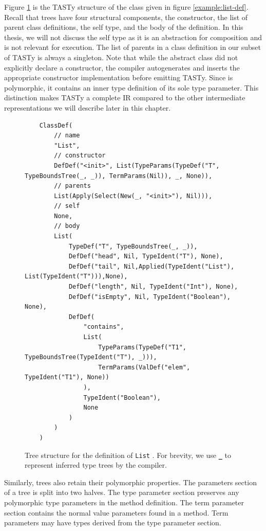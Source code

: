 Figure \ref{tasty:list} is the TASTy structure of the  class given in figure \ref{example:list-def}. 
Recall that  trees have four structural components, the constructor, the list of parent class definitions, the self type, and the body of the definition.
In this thesis, we will not discuss the self type as it is an abstraction for composition\cite{gilad:mixins}\cite{scala:calculus} and is not relevant for execution.
The list of parents in a class definition in our subset of TASTy is always a singleton.
Note that while the abstract  class did not explicitly declare a constructor, the compiler autogenerates and inserts the appropriate constructor implementation before emitting TASTy.
Since  is polymorphic, it contains an inner type definition of its sole type parameter.
This distinction makes TASTy a complete IR compared to the other intermediate representations we will describe later in this chapter.

\begin{figure}[!htb]
	\begin{verbatim}
	ClassDef(
		// name 
		"List",
		// constructor
		DefDef("<init>", List(TypeParams(TypeDef("T", TypeBoundsTree(_, _)), TermParams(Nil)), _, None)),
		// parents
		List(Apply(Select(New(_, "<init>"), Nil))),
		// self
		None,
		// body
		List(
			TypeDef("T", TypeBoundsTree(_, _)),
			DefDef("head", Nil, TypeIdent("T"), None),
			DefDef("tail", Nil,Applied(TypeIdent("List"), List(TypeIdent("T"))),None),
			DefDef("length", Nil, TypeIdent("Int"), None),
			DefDef("isEmpty", Nil, TypeIdent("Boolean"), None),
			DefDef(
				"contains",
				List(
					TypeParams(TypeDef("T1", TypeBoundsTree(TypeIdent("T"), _))),
					TermParams(ValDef("elem", TypeIdent("T1"), None))
				),
				TypeIdent("Boolean"),
				None
			)
		)
	)
	\end{verbatim} 
	\caption{Tree structure for the definition of \texttt{List} . For brevity, we use \textbf{\texttt{\_}} to represent inferred\cite{ml:type-inference} type trees by the compiler.}
	\label{tasty:list}
\end{figure}

Similarly,  trees also retain their polymorphic properties.
The parameters section of a  tree is split into two halves.
The type parameter section preserves any polymorphic type parameters in the method definition.
The term parameter section contains the normal value parameters found in a method.
Term parameters may have types derived from the type parameter section.

